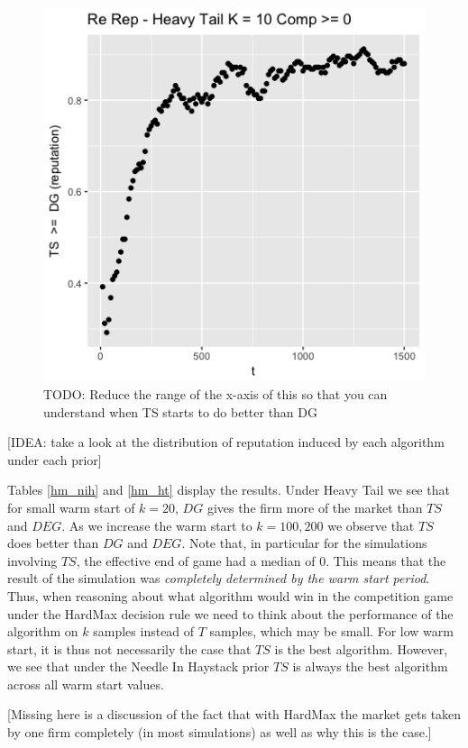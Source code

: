 \documentclass{article}
\theoremstyle{definition}
\begin{document}
\begin{figure}
\label{rel_rep_ht_fine}
\caption{Relative Reputation - Heavy Tail}
\includegraphics[scale=0.3]{figures/ts_dg_heavy_fine}
\caption*{TODO: Reduce the range of the x-axis of this so that you can understand when TS starts to do better than DG}
\end{figure}

[IDEA: take a look at the distribution of reputation induced by each algorithm under each prior]

Tables \ref{hm_nih} and \ref{hm_ht} display the results. Under Heavy Tail we see that for small warm start of $k = 20$, $DG$ gives the firm more of the market than $TS$ and $DEG$. As we increase the warm start to $k = 100, 200$ we observe that $TS$ does better than $DG$ and $DEG$. Note that, in particular for the simulations involving $TS$, the effective end of game had a median of 0. This means that the result of the simulation was \textit{completely determined by the warm start period}. Thus, when reasoning about what algorithm would win in the competition game under the HardMax decision rule we need to think about the performance of the algorithm on $k$ samples instead of $T$ samples, which may be small. For low warm start, it is thus not necessarily the case that $TS$ is the best algorithm. However, we see that under the Needle In Haystack prior $TS$ is always the best algorithm across all warm start values.

[Missing here is a discussion of the fact that with HardMax the market gets taken by one firm completely (in most simulations) as well as why this is the case.]
\end{document}
